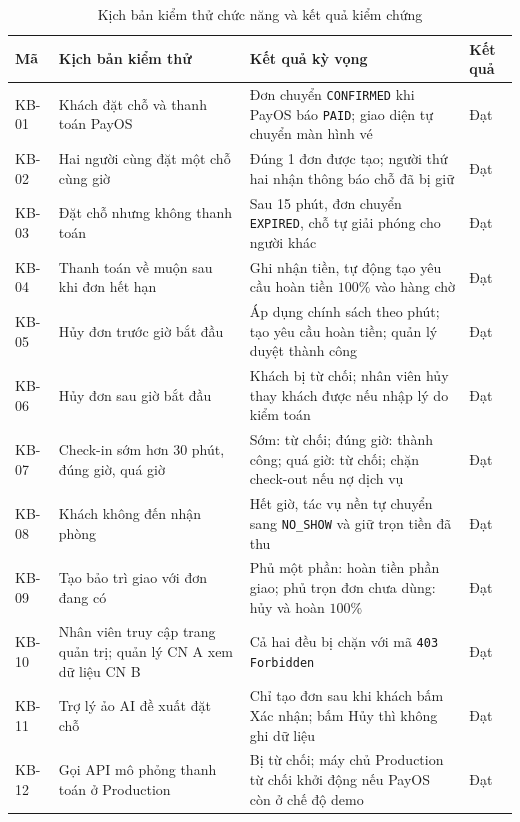 \begin{table}[H]
\centering
\caption{Kịch bản kiểm thử chức năng và kết quả kiểm chứng}
\label{tab:kt_kichban}
\footnotesize
\renewcommand{\arraystretch}{1.2}
\begin{tabular}{|p{1.3cm}|p{4.4cm}|p{6.4cm}|p{1.4cm}|}
\hline
\textbf{Mã} & \textbf{Kịch bản kiểm thử} & \textbf{Kết quả kỳ vọng} & \textbf{Kết quả} \\
\hline
KB-01 & Khách đặt chỗ và thanh toán PayOS & Đơn chuyển \texttt{CONFIRMED} khi PayOS báo \texttt{PAID}; giao diện tự chuyển màn hình vé & Đạt \\
\hline
KB-02 & Hai người cùng đặt một chỗ cùng giờ & Đúng 1 đơn được tạo; người thứ hai nhận thông báo chỗ đã bị giữ & Đạt \\
\hline
KB-03 & Đặt chỗ nhưng không thanh toán & Sau 15 phút, đơn chuyển \texttt{EXPIRED}, chỗ tự giải phóng cho người khác & Đạt \\
\hline
KB-04 & Thanh toán về muộn sau khi đơn hết hạn & Ghi nhận tiền, tự động tạo yêu cầu hoàn tiền $100\%$ vào hàng chờ & Đạt \\
\hline
KB-05 & Hủy đơn trước giờ bắt đầu & Áp dụng chính sách theo phút; tạo yêu cầu hoàn tiền; quản lý duyệt thành công & Đạt \\
\hline
KB-06 & Hủy đơn sau giờ bắt đầu & Khách bị từ chối; nhân viên hủy thay khách được nếu nhập lý do kiểm toán & Đạt \\
\hline
KB-07 & Check-in sớm hơn 30 phút, đúng giờ, quá giờ & Sớm: từ chối; đúng giờ: thành công; quá giờ: từ chối; chặn check-out nếu nợ dịch vụ & Đạt \\
\hline
KB-08 & Khách không đến nhận phòng & Hết giờ, tác vụ nền tự chuyển sang \texttt{NO\_SHOW} và giữ trọn tiền đã thu & Đạt \\
\hline
KB-09 & Tạo bảo trì giao với đơn đang có & Phủ một phần: hoàn tiền phần giao; phủ trọn đơn chưa dùng: hủy và hoàn $100\%$ & Đạt \\
\hline
KB-10 & Nhân viên truy cập trang quản trị; quản lý CN A xem dữ liệu CN B & Cả hai đều bị chặn với mã \texttt{403 Forbidden} & Đạt \\
\hline
KB-11 & Trợ lý ảo AI đề xuất đặt chỗ & Chỉ tạo đơn sau khi khách bấm Xác nhận; bấm Hủy thì không ghi dữ liệu & Đạt \\
\hline
KB-12 & Gọi API mô phỏng thanh toán ở Production & Bị từ chối; máy chủ Production từ chối khởi động nếu PayOS còn ở chế độ demo & Đạt \\
\hline
\end{tabular}
\end{table}

